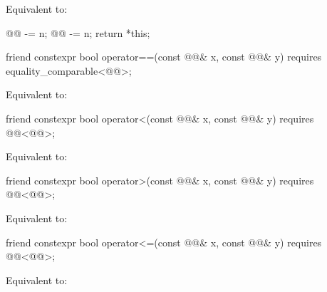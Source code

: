 \documentclass{wg21}
\begin{document}
\begin{itemdescr}
    \pnum
    \effects
    Equivalent to:
    \begin{codeblock}
        @@ -= n;
        @@ -= n;
        return *this;
    \end{codeblock}
\end{itemdescr}

\begin{itemdecl}
    friend constexpr bool operator==(const @@& x, const @@& y)
    requires equality_comparable<@@>;
\end{itemdecl}

\begin{itemdescr}
    \pnum
    \effects
    Equivalent to: 
\end{itemdescr}

\begin{itemdecl}
    friend constexpr bool operator<(const @@& x, const @@& y)
    requires @@<@@>;
\end{itemdecl}

\begin{itemdescr}
    \pnum
    \effects
    Equivalent to: 
\end{itemdescr}

\begin{itemdecl}
    friend constexpr bool operator>(const @@& x, const @@& y)
    requires @@<@@>;
\end{itemdecl}

\begin{itemdescr}
    \pnum
    \effects
    Equivalent to: 
\end{itemdescr}

\begin{itemdecl}
    friend constexpr bool operator<=(const @@& x, const @@& y)
    requires @@<@@>;
\end{itemdecl}

\begin{itemdescr}
    \pnum
    \effects
    Equivalent to: 
\end{itemdescr}
\end{document}
